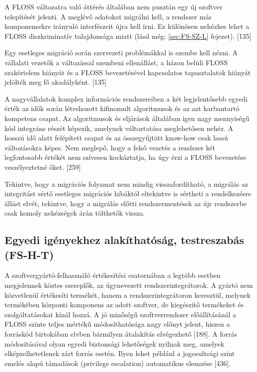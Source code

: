 \documentclass[12pt,magyar,a4paper,oneside]{scrreprt}
\begin{document}
A FLOSS változatra való áttérés általában nem pusztán egy új szoftver
telepítését jelenti. A meglévő adatokat migrálni kell, a rendszer más
komponensekre irányuló interfészeit újra kell írni. Ez különösen
nehézkes lehet a FLOSS diszkriminatív tulajdonsága miatt (lásd még:
\ref{sec:FS-SZ-L} fejezet). {[}135{]}

Egy esetleges migráció során szervezeti problémákkal is szembe kell
nézni. A vállalati vezetők a változással szembeni ellenállást, a házon
belüli FLOSS szakértelem hiányát és a FLOSS bevezetésével kapcsolatos
tapasztalatok hiányát jelölték meg fő akadályként. {[}135{]}

A nagyvállalatok komplex információs rendszereiben a két legjelentősebb
egyedi érték az idők során létrehozott kifinomult algoritmusok és az azt
karbantartó kompetens csapat. Az algoritmusok és eljárások általában
igen nagy mennyiségű kód integráns részét képezik, amelynek változtatása
meglehetősen nehéz. A hosszú idő alatt felépített csapat és az
összegyűjtött know-how csak lassú változásokra képes. Nem meglepő, hogy
a felső vezetés a rendszer két legfontosabb értékét nem szívesen
kockáztatja, ha úgy érzi a FLOSS bevezetése veszélyeztetné őket.
{[}259{]}

Tekintve, hogy a migrációs folyamat nem mindig visszafordítható, a
migrálás az integritást sértő esetleges migrációs hibáktól eltekintve is
sértheti a rendelkezésre állást elvét, tekintve, hogy a migrálás előtti
rendszermentések az újr rendszerbe csak komoly nehézségek árán tölthetők
vissza.

\hypertarget{sec:FS-H-T}{%
\subsection{Egyedi igényekhez alakíthatóság, testreszabás
(FS-H-T)}\label{sec:FS-H-T}}

A szoftvergyártó-felhasználó értékesítési csatornában a legtöbb esetben
megjelennek köztes szereplők, az úgynevezett rendszerintegrátorok. A
gyártó nem közvetlenül értékesíti termékét, hanem a rendszerintegrátoron
keresztül, melynek termékében központi komponens az adott szoftver, de
kiegészítő termékeket és szolgáltatásokat kínál hozzá. A jó minőségű
szoftverrendszer előállításánál a FLOSS szinte teljes mértékű
módosíthatósága nagy előnyt jelent, hiszen a forráskód birtokában elvben
bármilyen átalakítás elvégezhető {[}188{]}. A forrás módosításával olyan
egyedi biztonsági lehetőségek nyílnak meg, amelyek elképzelhetetlenek
zárt forrás esetén. Ilyen lehet például a jogosultsági szint emelés
alapú támadások (privilege escalation) automatikus elemzése {[}436{]}.
\end{document}
